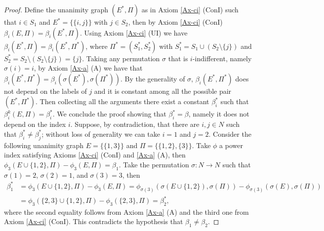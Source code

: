 \documentclass[preprint,11pt,authoryear]{elsarticle}
\theoremstyle{plain}
\begin{document}
\begin{proof}
	Define the unanimity graph $(E^*,\Pi)$ as in Axiom \ref{Ax-ci} (ConI) such that $i\in S_1$ and $E^*=\{\{i,j\}\}$ with $j\in S_2$, then by Axiom \ref{Ax-ci} (ConI) $\beta_i(E,\Pi)=\beta_i(E^*,\Pi)$. Using Axiom \ref{Ax-ci} (UI) we have $\beta_i(E^*,\Pi)=\beta_i(E^*,\Pi^*)$, where $\Pi^*=(S_1^*,S_2^*)$ with   $S_1^*=S_1\cup (S_2\setminus\{j\})$ and $S_2^*= S_2\setminus (S_2\setminus\{j\})=\{j\}$. Taking any permutation $\sigma$ that is $i$-indifferent, namely $\sigma(i)=i$, by Axiom \ref{Ax-a} (A) we have that $\beta_i(E^*,\Pi^*)=\beta_i(\sigma(E^*),\sigma(\Pi^*))$. By the generality of $\sigma$, $\beta_i(E^*,\Pi^*)$ does not depend on the labels of $j$ and it is constant among all the possible pair $(E^*,\Pi^*)$. Then collecting all the arguments there exist a constant $\beta_i^*$ such that $\beta_i^k(E,\Pi)=\beta_i^*$. We conclude the proof showing that $\beta_i^*=\beta$, namely it does not depend on the index $i$. Suppose, by contradiction, that there are $i,j\in N$ such that $\beta_i^*\neq \beta_j^*$; without loss of generality we can take $i=1$ and $j=2$. Consider the following unanimity graph $E=\big\{\{1,3\}\big\}$ and $\Pi=\big\{\{1,2\},\{3\}\big\}$. Take $\phi$ a power index satisfying Axioms \ref{Ax-ci} (ConI) and \ref{Ax-a} (A), then $\phi_3(E\cup\{1,2\},\Pi)-\phi_3(E,\Pi)=\beta_1$. Take the permutation $\sigma:N\to N$ such that $\sigma(1)=2$, $\sigma(2)=1$, and $\sigma(3)=3$, then 
	\begin{align*}
		\beta_1^*&=\phi_3(E\cup\{1,2\},\Pi)-\phi_3(E,\Pi)=\phi_{\sigma(3)}(\sigma(E\cup\{1,2\}),\sigma(\Pi))-\phi_{\sigma(3)}(\sigma(E),\sigma(\Pi))\\
		&= \phi_3(\{2,3\}\cup\{1,2\},\Pi)-\phi_3(\{2,3\},\Pi)=\beta_2^*,
	\end{align*}
	where the second equality follows from Axiom \ref{Ax-a} (A) and the third one from Axiom \ref{Ax-ci} (ConI). This contradicts the hypothesis that $\beta_1\neq\beta_2$.
\end{proof}
\end{document}
